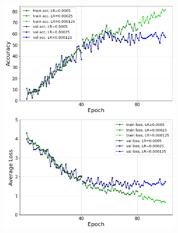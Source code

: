 \documentclass[10pt,twocolumn,hidelinks,letterpaper]{article}
\begin{document}
\begin{figure}
\begin{subfigure}{.325\linewidth}
  	\includegraphics[width=\linewidth]{images/grid_comparison/acc62lr5e-4step4080gamma05_no_reg.png}
  \end{subfigure}
  \begin{subfigure}{.325\linewidth}

\end{subfigure}
\end{figure}
\end{document}
